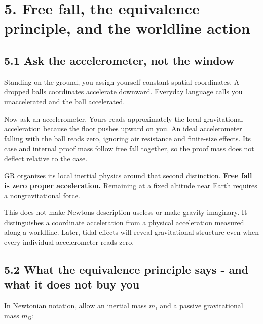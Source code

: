 \documentclass[
  11pt,
  letterpaper,
  oneside,
  openany]{scrbook}
\begin{document}
\hypertarget{chapter-5}{%
\chapter{5. Free fall, the equivalence principle, and the worldline
action}\label{chapter-5}}

\hypertarget{ask-the-accelerometer-not-the-window}{%
\section{5.1 Ask the accelerometer, not the
window}\label{ask-the-accelerometer-not-the-window}}

Standing on the ground, you assign yourself constant spatial
coordinates. A dropped ball\textquotesingle s coordinates accelerate
downward. Everyday language calls you unaccelerated and the ball
accelerated.

Now ask an accelerometer. Yours reads approximately the local
gravitational acceleration because the floor pushes upward on you. An
ideal accelerometer falling with the ball reads zero, ignoring air
resistance and finite-size effects. Its case and internal proof mass
follow free fall together, so the proof mass does not deflect relative
to the case.

GR organizes its local inertial physics around that second distinction.
\textbf{Free fall is zero proper acceleration.} Remaining at a fixed
altitude near Earth requires a nongravitational force.

This does not make Newton\textquotesingle s description useless or make
gravity imaginary. It distinguishes a coordinate acceleration from a
physical acceleration measured along a worldline. Later, tidal effects
will reveal gravitational structure even when every individual
accelerometer reads zero.

\hypertarget{what-the-equivalence-principle-says---and-what-it-does-not-buy-you}{%
\section{5.2 What the equivalence principle says - and what it does not
buy
you}\label{what-the-equivalence-principle-says---and-what-it-does-not-buy-you}}

In Newtonian notation, allow an inertial mass \(m_{\mathrm{I}}\) and a
passive gravitational mass \(m_{\mathrm{G}}\):

\begin{center}
\begingroup
{}
\ifdim\wd\grmathbox>\linewidth
\resizebox{\linewidth}{!}{\usebox{\grmathbox}}
\else\usebox{\grmathbox}\fi
\endgroup
\end{center}
\end{document}
